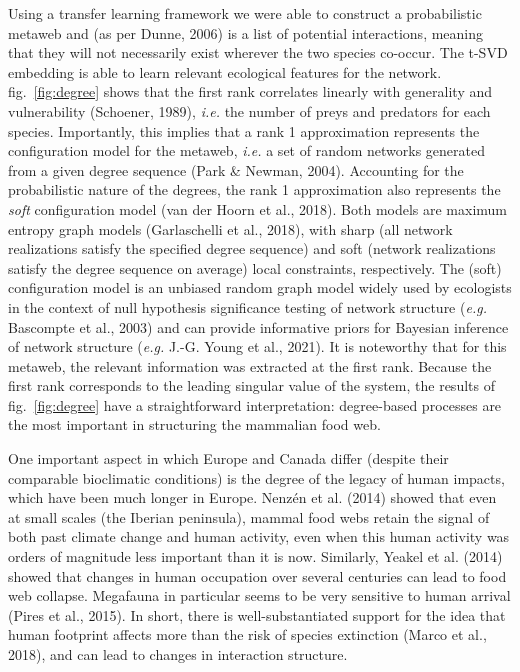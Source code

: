 \documentclass[11pt]{article}
\begin{document}
Using a transfer learning framework we were able to construct a
probabilistic metaweb and (as per Dunne, 2006) is a list of potential
interactions, meaning that they will not necessarily exist wherever the
two species co-occur. The t-SVD embedding is able to learn relevant
ecological features for the network. fig.~\ref{fig:degree} shows that
the first rank correlates linearly with generality and vulnerability
(Schoener, 1989), \emph{i.e.} the number of preys and predators for each
species. Importantly, this implies that a rank 1 approximation
represents the configuration model for the metaweb, \emph{i.e.} a set of
random networks generated from a given degree sequence (Park \& Newman,
2004). Accounting for the probabilistic nature of the degrees, the rank
1 approximation also represents the \emph{soft} configuration model (van
der Hoorn et al., 2018). Both models are maximum entropy graph models
(Garlaschelli et al., 2018), with sharp (all network realizations
satisfy the specified degree sequence) and soft (network realizations
satisfy the degree sequence on average) local constraints, respectively.
The (soft) configuration model is an unbiased random graph model widely
used by ecologists in the context of null hypothesis significance
testing of network structure (\emph{e.g.} Bascompte et al., 2003) and
can provide informative priors for Bayesian inference of network
structure (\emph{e.g.} J.-G. Young et al., 2021). It is noteworthy that
for this metaweb, the relevant information was extracted at the first
rank. Because the first rank corresponds to the leading singular value
of the system, the results of fig.~\ref{fig:degree} have a
straightforward interpretation: degree-based processes are the most
important in structuring the mammalian food web.

One important aspect in which Europe and Canada differ (despite their
comparable bioclimatic conditions) is the degree of the legacy of human
impacts, which have been much longer in Europe. Nenzén et al. (2014)
showed that even at small scales (the Iberian peninsula), mammal food
webs retain the signal of both past climate change and human activity,
even when this human activity was orders of magnitude less important
than it is now. Similarly, Yeakel et al. (2014) showed that changes in
human occupation over several centuries can lead to food web collapse.
Megafauna in particular seems to be very sensitive to human arrival
(Pires et al., 2015). In short, there is well-substantiated support for
the idea that human footprint affects more than the risk of species
extinction (Marco et al., 2018), and can lead to changes in interaction
structure.
\end{document}
